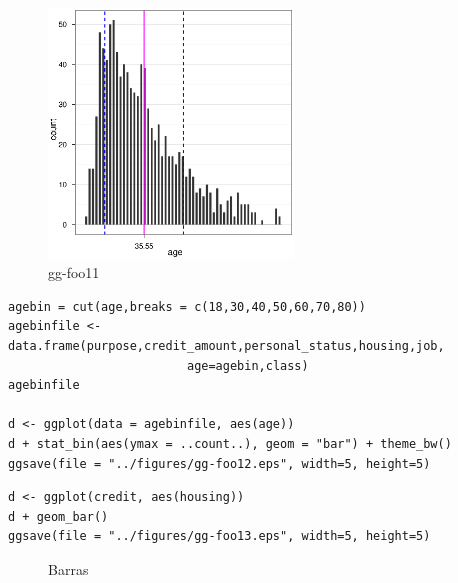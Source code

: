 \begin{figure}[h]
 \centering
 \includegraphics[keepaspectratio,width=6.5cm]{theimg/gg-foo11}
 \caption[foo11]{gg-foo11}
 \label{fig:foo11}
\end{figure}

\begin{verbatim}
agebin = cut(age,breaks = c(18,30,40,50,60,70,80))
agebinfile <- data.frame(purpose,credit_amount,personal_status,housing,job,
                         age=agebin,class)
agebinfile

d <- ggplot(data = agebinfile, aes(age)) 
d + stat_bin(aes(ymax = ..count..), geom = "bar") + theme_bw()
ggsave(file = "../figures/gg-foo12.eps", width=5, height=5)
\end{verbatim}

\begin{verbatim}
d <- ggplot(credit, aes(housing))
d + geom_bar()
ggsave(file = "../figures/gg-foo13.eps", width=5, height=5)
\end{verbatim}

\begin{figure}[h]
 \begin{center}
 \hspace{0.1cm}
 \caption{Barras}
 \label{fig:barras}
 \end{center}
\end{figure}

